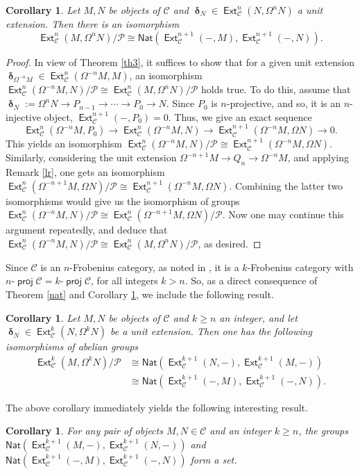 \documentclass[11pt,a4paper]{amsart}
\newcommand{\rt}{\rightarrow}
\newcommand{\lrt}{\longrightarrow}
\newcommand{\C}{\mathscr{C} }
\newcommand{\p}{\mathfrak{p} }
\def\proj{\operatorname{\mathsf{proj}}}
\def\Ext{\operatorname{{\mathsf{Ext}}}}
\def\syz{\mathsf{\Omega}}
\def\p{\mathcal P}
\def\de{\operatorname{\boldsymbol{\delta}}}
\newcommand{\nat}{{\mathsf{Nat}}}
\newtheorem{cor}[theorem]{Corollary}
\theoremstyle{definition}
\theoremstyle{plain}
\theoremstyle{definition}
\numberwithin{equation}{section}
\begin{document}
\begin{cor}\label{cc}Let $M, N$ be objects of $\C$ and $\de_N\in\Ext^n_{\C}(N, \syz^nN)$ a unit extension. Then there is an isomorphism $$\Ext^n_{\C}(M, \syz^nN)/{\p}\cong\nat(\Ext^{n+1}_{\C}(-, M), \Ext^{n+1}_{\C}(-, N)).$$
\end{cor}
\begin{proof}
In view of Theorem \ref{th3}, it suffices to show that for a given unit extension $\de_{\syz^{-n}M}\in\Ext^n_{\C}(\syz^{-n}M, M)$, an isomorphism  $\Ext^n_{\C}(\syz^{-n}M, N)/{\p}\cong\Ext^n_{\C}(M, \syz^nN)/{\p}$ holds true. To do this, assume that $\de_N:=\syz^nN\rt P_{n-1}\rt\cdots\rt P_0\rt N$. Since $P_0$ is $n$-projective, and so, it is an $n$-injective object, $\Ext^{n+1}_{\C}(-, P_0)=0$. Thus, we give an exact sequence $$\Ext^n_{\C}(\syz^{-n}M, P_0)\lrt\Ext^n_{\C}(\syz^{-n}M, N)\lrt\Ext^{n+1}_{\C}(\syz^{-n}M, \syz N)\lrt 0.$$This yields an isomorphism $\Ext^n_{\C}(\syz^{-n}M, N)/{\p}\cong\Ext^{n+1}_{\C}(\syz^{-n}M, \syz N)$. Similarly, considering the unit extension $\syz^{-n+1}M\rt Q_n\rt\syz^{-n}M$, and applying Remark \ref{lr}, one gets an isomorphism $\Ext^n_{\C}(\syz^{-n+1}M, \syz N)/{\p}\cong \Ext^{n+1}_{\C}(\syz^{-n}M, \syz N)$. Combining the latter two isomorphisms would give us the isomorphism of groups $\Ext^n_{\C}(\syz^{-n}M, N)/{\p}\cong\Ext^n_{\C}(\syz^{-n+1}M, \syz N)/{\p}$. Now one may continue this argument repeatedly, and deduce that $\Ext^n_{\C}(\syz^{-n}M, N)/{\p}\cong\Ext^n_{\C}(M, \syz^n N)/{\p}$, as desired.
\end{proof}

Since $\C$ is an $n$-Frobenius category, as noted in \cite[Remark 2.4]{bfss}, it is a $k$-Frobenius category with $n$-$\proj\C=k$-$\proj\C$, for all integers $k>n$. So, as a direct consequence of Theorem \ref{nat} and Corollary \ref{cc}, we include the following result.
\begin{cor}\label{ccc}Let $M, N$ be objects of $\C$ and $k\geq n$ an integer, and let $\de_N\in\Ext^k_{\C}(N, \syz^kN)$ be a unit extension. Then one has the following isomorphisms of abelian groups
\[\begin{array}{lllll}
\Ext^k_{\C}(M, \syz^kN)/{\p} & \cong \nat(\Ext^{k+1}_{\C}(N, -), \Ext^{k+1}_{\C}(M, -))\\
& \cong \nat(\Ext^{k+1}_{\C}(-, M), \Ext^{k+1}_{\C}(-, N)).
\end{array}\]
\end{cor}
The above corollary immediately yields the following interesting result.
\begin{cor}For any pair of objects $M, N\in\C$ and an integer $k\geq n$,  the groups $\nat(\Ext^{k+1}_{\C}(M, -), \Ext^{k+1}_{\C}(N, -))$ and $\nat(\Ext^{k+1}_{\C}(-, M), \Ext^{k+1}_{\C}(-, N))$ form a set.
\end{cor}
\end{document}
